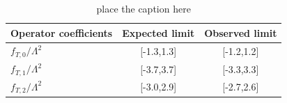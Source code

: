 \begin{figure}[htb]
\centering
\caption{}
\label{fig:CMSWWW}
\end{figure}

\begin{table}[t]
\begin{center}
\caption{ place the caption here }
\label{tab:CMSWWWLimits}
\begin{tabular}{l|cc}
Operator coefficients & Expected limit & Observed limit\\ \hline
$f_{T,0} / \Lambda^2$ & [-1.3,1.3]     & [-1.2,1.2]    \\
$f_{T,1} / \Lambda^2$ & [-3.7,3.7]     & [-3.3,3.3]    \\
$f_{T,2} / \Lambda^2$ & [-3.0,2.9]     & [-2.7,2.6]    \\
\end{tabular}
\end{center}
\end{table}

